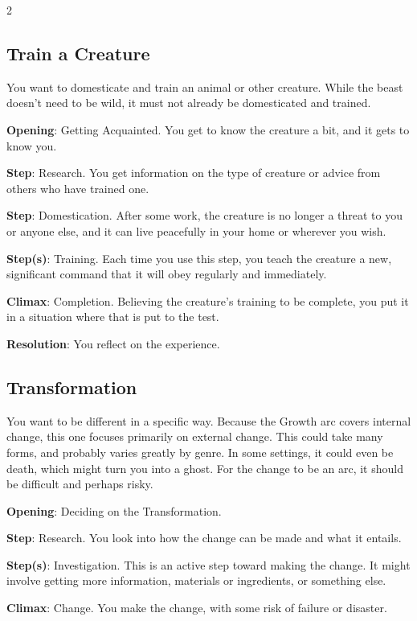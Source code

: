 \begin{multicols}{2}
\subsection{Train a Creature}

You want to domesticate and train an animal or other creature. While the beast doesn’t need to be wild, it must not already be domesticated and trained.

\textbf{Opening}: Getting Acquainted. You get to know the creature a bit, and it gets to know you.

\textbf{Step}: Research. You get information on the type of creature or advice from others who have trained one.

\textbf{Step}: Domestication. After some work, the creature is no longer a threat to you or anyone else, and it can live peacefully in your home or wherever you wish.

\textbf{Step(s)}: Training. Each time you use this step, you teach the creature a new, significant command that it will obey regularly and immediately.

\textbf{Climax}: Completion. Believing the creature’s training to be complete, you put it in a situation where that is put to the test. 

\textbf{Resolution}: You reflect on the experience.

\subsection{Transformation}

You want to be different in a specific way. Because the Growth arc covers internal change, this one focuses primarily on external change. This could take many forms, and probably varies greatly by genre. In some settings, it could even be death, which might turn you into a ghost. For the change to be an arc, it should be difficult and perhaps risky. 

\textbf{Opening}: Deciding on the Transformation.

\textbf{Step}: Research. You look into how the change can be made and what it entails.

\textbf{Step(s)}: Investigation. This is an active step toward making the change. It might involve getting more information, materials or ingredients, or something else.

\textbf{Climax}: Change. You make the change, with some risk of failure or disaster. 


\end{multicols}
